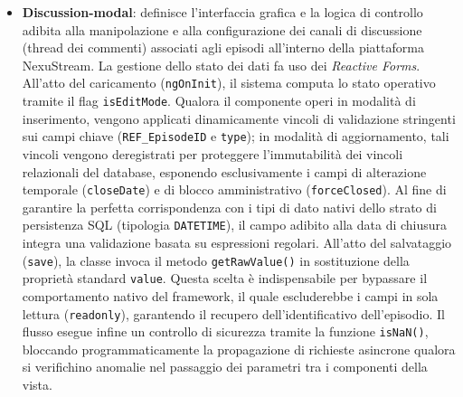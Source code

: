 \documentclass[11pt,a4paper]{article}
\begin{document}
\begin{itemize}
    I metodi \texttt{rispondiA} e \texttt{scrollToComment} estendono le API native del browser (\texttt{scrollIntoView} e \texttt{setFocus}) sincronizzandole con il ciclo di vita dei rendering di Angular tramite macro-task (\texttt{setTimeout}). Questa implementazione garantisce transizioni fluide dell'interfaccia e l'attivazione automatica delle tastiere software sui sistemi operativi Android e iOS durante le interazioni rapide.
    \item \textbf{Discussion-modal}: definisce l'interfaccia grafica e la logica di controllo adibita alla manipolazione e alla configurazione dei canali di discussione (thread dei commenti) associati agli episodi all'interno della piattaforma NexuStream. La gestione dello stato dei dati fa uso dei \textit{Reactive Forms}. All'atto del caricamento (\texttt{ngOnInit}), il sistema computa lo stato operativo tramite il flag \texttt{isEditMode}. Qualora il componente operi in modalità di inserimento, vengono applicati dinamicamente vincoli di validazione stringenti sui campi chiave (\texttt{REF\_EpisodeID} e \texttt{type}); in modalità di aggiornamento, tali vincoli vengono deregistrati per proteggere l'immutabilità dei vincoli relazionali del database, esponendo esclusivamente i campi di alterazione temporale (\texttt{closeDate}) e di blocco amministrativo (\texttt{forceClosed}). Al fine di garantire la perfetta corrispondenza con i tipi di dato nativi dello strato di persistenza SQL (tipologia \texttt{DATETIME}), il campo adibito alla data di chiusura integra una validazione basata su espressioni regolari. All'atto del salvataggio (\texttt{save}), la classe invoca il metodo \texttt{getRawValue()} in sostituzione della proprietà standard \texttt{value}. Questa scelta è indispensabile per bypassare il comportamento nativo del framework, il quale escluderebbe i campi in sola lettura (\texttt{readonly}), garantendo il recupero dell'identificativo dell'episodio. Il flusso esegue infine un controllo di sicurezza tramite la funzione \texttt{isNaN()}, bloccando programmaticamente la propagazione di richieste asincrone qualora si verifichino anomalie nel passaggio dei parametri tra i componenti della vista.

\end{itemize}
\end{document}
